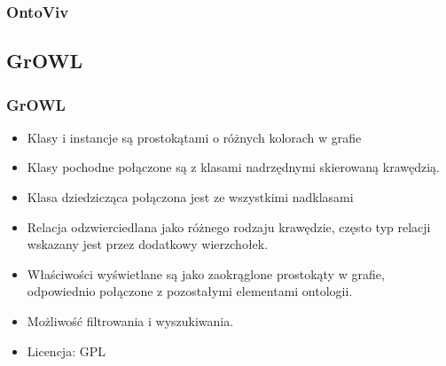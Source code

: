 \documentclass{beamer}
\begin{document}
\begin{frame}
  \frametitle{OntoViv}
\begin{center}
\end{center}
\end{frame}

\subsection{GrOWL}
\begin{frame}
  \frametitle{GrOWL}
\begin{itemize}
    \item Klasy i instancje są prostokątami o różnych kolorach w grafie
    \item Klasy pochodne połączone są z klasami nadrzędnymi skierowaną krawędzią.  
    \item Klasa dziedzicząca połączona jest ze wszystkimi nadklasami
    \item Relacja odzwierciedlana jako różnego rodzaju krawędzie, często typ relacji wskazany jest przez dodatkowy wierzchołek.
    \item Właściwości wyświetlane są jako zaokrąglone prostokąty w grafie, odpowiednio połączone z pozostałymi elementami ontologii.
    \item Możliwość filtrowania i wyszukiwania.
    \item Licencja: GPL
  \end{itemize}

\end{frame}
\end{document}
